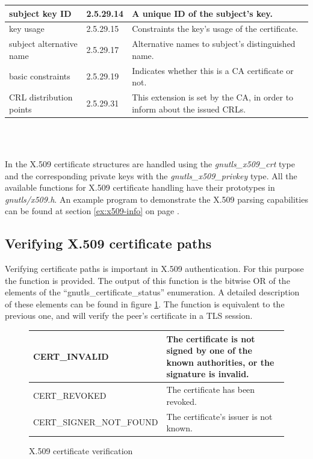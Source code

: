 \label{fig:x509_ext}
\begin{tabular}{|l|l|p{6cm}|}
\hline
subject key ID & 2.5.29.14 & A unique ID of the subject's key.
\\
\hline
key usage & 2.5.29.15 & Constraints the key's usage of the certificate.
\\
\hline
subject alternative name & 2.5.29.17 & Alternative names to subject's distinguished name.
\\
\hline
basic constraints & 2.5.29.19 & Indicates whether this is a CA certificate or not.
\\
\hline
CRL distribution points & 2.5.29.31 & This extension is set by the CA, in order to inform about the issued CRLs.
\\
\hline
\end{tabular}
\\
\\
\par
In \gnutls{} the X.509 certificate structures are handled using the
\emph{gnutls\_x509\_crt} type and the corresponding private keys with
the \emph{gnutls\_x509\_privkey} type.
All the available functions for X.509 certificate handling have their 
prototypes in \emph{gnutls/x509.h}. An example program to demonstrate the 
X.509 parsing capabilities can be found at section \ref{ex:x509-info} on 
page \pageref{ex:x509-info}.

\subsection{Verifying X.509 certificate paths}
Verifying certificate paths is important 
in X.509 authentication. For this purpose the function
 is provided. The
output of this function is the bitwise OR of the elements of the
``gnutls\_certificate\_status'' enumeration. A detailed description of
these elements can be found in figure \ref{fig:verify}.
The function 
is equivalent to the previous one, and will verify the peer's certificate in a TLS session.

\begin{figure}[hbtp]
\begin{tabular}{|l|p{7cm}|}

\hline
CERT\_INVALID & The certificate is not signed by one of the known authorities, or
the signature is invalid.
\\
\hline
CERT\_REVOKED & The certificate has been revoked.
\\
\hline
CERT\_SIGNER\_NOT\_FOUND & The certificate's issuer is not known.
\\
\hline
\end{tabular}
\caption{X.509 certificate verification}
\label{fig:verify}
\end{figure}

